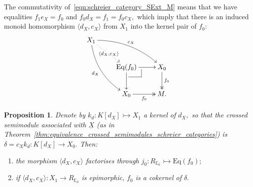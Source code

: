 \documentclass[a4paper]{amsart}
\makeatletter
\theoremstyle{plain}
\newtheorem{proposition}[subsection]{Proposition}
\theoremstyle{definition}
\theoremstyle{remark}
\newcommand{\pullback}[4]{{#1 \leftindex_{#2}{\times}_{#3} #4}}
\newcommand{\la}{\langle}
\newcommand{\ra}{\rangle}
\def\pullback{%
 \ar@{-}[]+R+<4pt,-3pt>;[]+RD+<4pt,-6pt>%
 \ar@{-}[]+D+<3pt,-6pt>;[]+RD+<4pt,-6pt>}
\makeatother
\begin{document}
The commutativity of~\eqref{eqn:schreier_category_SExt_M} means that we have equalities $f_1e_X=f_0$ and $f_0d_X=f_1=f_0c_X,$ which imply that there is an induced monoid homomorphism $\la d_X,c_X\ra$ from $X_1$ into the kernel pair of $f_0$:
\begin{equation*}
\xymatrix{
{X_1} \ar@/^1pc/[rrd]^-{c_X} \ar@/_1pc/[rdd]_-{d_X} \ar@{.>}[rd]|{\la d_X,c_X\ra} &\ &\ \\
&{\mathrm{Eq}(f_0)} \pullback\ar[d] \ar[r]  &{X_0} \ar@{->>}[d]^-{f_0} \\
&{X_0} \ar@{->>}[r]_-{f_0} &{M.}
}
\end{equation*}
\begin{proposition}
\label{prop:d_X,c_X-inside_R}
Denote by $k_d\colon K[d_X]\rightarrowtail X_1$ a kernel of $d_X,$ so that the crossed semimodule associated with $\underline{X}$ (as in Theorem~\ref{thm:equivalence_crossed_semimodules_schreier_categories}) is $\delta=c_Xk_d\colon K[d_X]\rightarrow X_0.$ Then:
\begin{enumerate}
\item the morphism $\la d_X,c_X\ra$ factorises through $j_0\colon R_{\mathbb{E}_0}\rightarrowtail \mathrm{Eq}(f_0);$
\item if $\la d_X,c_X\ra\colon X_1\rightarrow R_{\mathbb{E}_0}$ is epimorphic, $f_0$ is a cokernel of $\delta.$
\end{enumerate}
\end{proposition}
\end{document}
